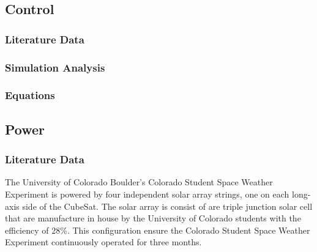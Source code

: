 \subsection{Control}
\subsubsection{Literature Data}
\subsubsection{Simulation Analysis}
\subsubsection{Equations}


\subsection{Power}
\subsubsection{Literature Data}
The University of Colorado Boulder's Colorado Student Space Weather Experiment is powered by four independent solar array strings, one on each long-axis side of the CubeSat. The solar array is consist of are triple junction solar cell that are manufacture in house by the University of Colorado students with the efficiency of 28\%\cite{UCB_EPS}. This configuration ensure the Colorado Student Space Weather Experiment continuously operated for three months.  
